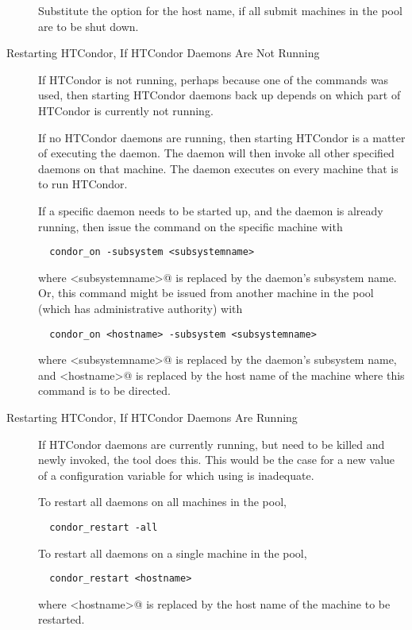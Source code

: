 \begin{description}
Substitute the option  for the host name,
if all submit machines in the pool are to be shut down.

\item[Restarting HTCondor, If HTCondor Daemons Are Not Running]
If HTCondor is not running,
perhaps because one of the  commands was used,
then starting HTCondor daemons back up depends on which part of
HTCondor is currently not running.

If no HTCondor daemons are running, then starting HTCondor is a matter
of executing the  daemon.
The  daemon will then invoke all other specified daemons
on that machine.
The  daemon executes on every machine that is to run HTCondor.

If a specific daemon needs to be started up, and the  daemon
is already running, then issue the command on the specific machine with
\begin{verbatim}
  condor_on -subsystem <subsystemname>
\end{verbatim}
where \verb@<subsystemname>@ is replaced by the daemon's subsystem
name.
Or, this command might be issued from another machine in the pool
(which has administrative authority) with
\begin{verbatim}
  condor_on <hostname> -subsystem <subsystemname>
\end{verbatim}
where \verb@<subsystemname>@ is replaced by the daemon's subsystem
name, and \verb@<hostname>@ is replaced by the host name of the
machine where this  command is to be directed.

\item[Restarting HTCondor, If HTCondor Daemons Are Running]
If HTCondor daemons are currently running, but need to be killed and
newly invoked,
the  tool does this.
This would be the case for a new value of a configuration variable for
which using  is inadequate.

To restart all daemons on all machines in the pool,
\begin{verbatim}
  condor_restart -all
\end{verbatim}

To restart all daemons on a single machine in the pool,
\begin{verbatim}
  condor_restart <hostname>
\end{verbatim}
where \verb@<hostname>@ is replaced by the host name of the
machine to be restarted.

\end{description}

